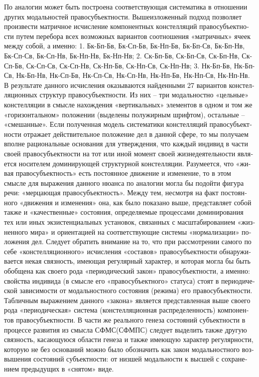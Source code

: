 \begin{russian}
    По аналогии может быть построена соответствующая систематика в отношении других модальностей правосубъектности. 
    Вышеизложенный подход  позволяет произвести матричное исчисление компонентных констелляций правосубъектности путем перебора всех возможных вариантов соотношения  «матричных» ячеек между собой, а именно:
    1.        Бк-Бп-Бв, Бк-Сп-Бв, Бк-Нп-Бв, Бк-Бп-Св, Бк-Бп-Нв, Бк-Сп-Св, Бк-Сп-Нв, Бк-Нп-Нв, Бк-Нп-Нв;
    2.        Ск-Бп-Бв, Ск-Бп-Св, Ск-Бп-Нв, Ск-Сп-Бв,  Ск-Сп-Св, Ск-Сп-Нв, Ск-Нп-Бв, Ск-Нп-Св,  Ск-Нп-Нв;
    3.        Нк-Бп-Бв, Нк-Бп-Св, Нк-Бп-Нв, Нк-Сп-Бв, Нк-Сп-Св, Нк-Сп-Нв, Нк-Нп-Бв, Нк-Нп-Св, Нк-Нп-Нв.
    В результате данного исчисления оказываются найденными 27 вариантов констелляционных структур правосубъектности. Из них – три модальностно «цельные» констелляции в смысле нахождения «вертикальных» элементов в одном и том же «горизонтальном» положении (выделены полужирным шрифтом), остальные – «смешанные».
    Если полученная модель систематики констелляций правосубъектности отражает действительное положение дел в данной сфере, то мы получаем вполне рациональные основания для утверждения, что каждый индивид в части своей правосубъектности на тот или иной момент своей жизнедеятельности является носителем доминирующей структурной констелляции.  Разумеется, что «живая правосубъектность» есть постоянное движение и изменение, то в этом смысле для выражения данного нюанса по аналогии могла бы подойти фигура речи: «мерцающая правосубъектность». Между тем, несмотря на факт постоянного «движения и изменения» она, как было показано выше, представляет собой также и «качественные» состояния, определяемые процессами доминирования тех или иных экзистенциальных установок, связанных с масштабированием «жизненного мира» и ориентацией на соответствующие системы «нормализации» положения дел.
    Следует обратить внимание на то, что при рассмотрении самого по себе «констелляционного» исчисления «составов» правосубъектности обнаруживается некая связность, имеющая регулярный характер, и которая могла бы быть обобщена как своего рода «периодический закон» правосубъектности, а именно: свойства индивида (в смысле его «правосубъектного» статуса) стоят в периодической зависимости от модальностного состояния (режима) его правосубъектности. Табличным выражением данного «закона» является представленная выше своего рода «периодическая» система (констелляционная распределенность) компонентов правосубъектности. В части же реального генеза состояний субъектности в процессе развития из смысла СФМС(СФМПС) следует выделить также другую связность, касающуюся области генеза и также имеющую характер регулярности,  которую не без оснований можно было обозначить как закон модальностного возвышения состояний субъектности: от низшей модальности к высшей с сохранением предыдущих в «снятом» виде. 

\end{russian}
